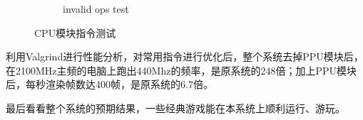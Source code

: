 \documentclass[a4paper]{ltxdoc}
\begin{document}
{\begin{figure}[h]
\begin{subfigure}[b]{0.49\textwidth}
			\caption{invalid ops test}
		\end{subfigure}
		\caption{CPU模块指令测试}
		\label{fig:ops_test}
\end{figure}

利用Valgrind进行性能分析，对常用指令进行优化后，整个系统去掉PPU模块后，在2100MHz主频的电脑上跑出440Mhz的频率，是原系统的248倍；加上PPU模块后，每秒渲染帧数达400帧，是原系统的6.7倍。

最后看看整个系统的预期结果，一些经典游戏能在本系统上顺利运行、游玩。

}
\end{document}
